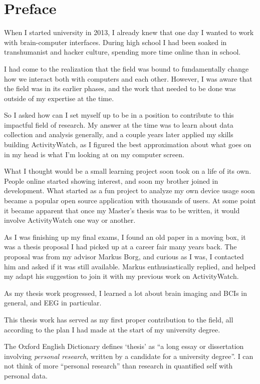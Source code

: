 \section*{Preface}

When I started university in 2013, I already knew that one day I wanted to work with brain-computer interfaces. During high school I had been soaked in transhumanist and hacker culture, spending more time online than in school.

I had come to the realization that the field was bound to fundamentally change how we interact both with computers and each other. However, I was aware that the field was in its earlier phases, and the work that needed to be done was outside of my expertise at the time.

So I asked how can I set myself up to be in a position to contribute to this impactful field of research. My answer at the time was to learn about data collection and analysis generally, and a couple years later applied my skills building ActivityWatch, as I figured the best approximation about what goes on in my head is what I'm looking at on my computer screen.

What I thought would be a small learning project soon took on a life of its own. People online started showing interest, and soon my brother joined in development. What started as a fun project to analyze my own device usage soon became a popular open source application with thousands of users. At some point it became apparent that once my Master's thesis was to be written, it would involve ActivityWatch one way or another.

As I was finishing up my final exams, I found an old paper in a moving box, it was a thesis proposal I had picked up at a career fair many years back. The proposal was from my advisor Markus Borg, and curious as I was, I contacted him and asked if it was still available. Markus enthusiastically replied, and helped my adapt his suggestion to join it with my previous work on ActivityWatch.

As my thesis work progressed, I learned a lot about brain imaging and BCIs in general, and EEG in particular.

This thesis work has served as my first proper contribution to the field, all according to the plan I had made at the start of my university degree.

The Oxford English Dictionary defines `thesis' as ``a long essay or dissertation involving \emph{personal research}, written by a candidate for a university degree''. I can not think of more ``personal research'' than research in quantified self with personal data.
